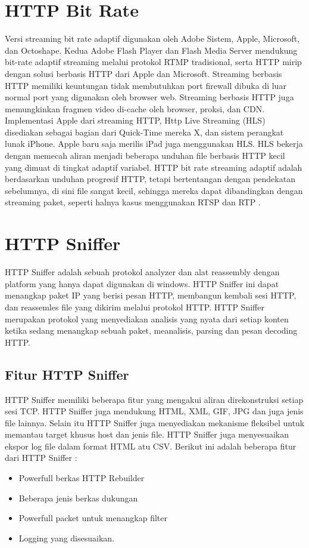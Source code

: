 \section{HTTP Bit Rate}
Versi streaming bit rate adaptif digunakan oleh Adobe Sistem, Apple, Microsoft, dan Octoshape. Kedua Adobe Flash Player dan Flash Media Server mendukung bit-rate adaptif streaming melalui protokol RTMP tradisional, serta HTTP mirip dengan solusi berbasis HTTP dari Apple dan Microsoft. Streaming berbasis HTTP memiliki keuntungan tidak membutuhkan port firewall dibuka di luar normal port yang digunakan oleh browser web. Streaming berbasis HTTP juga memungkinkan fragmen video di-cache oleh browser, proksi, dan CDN. Implementasi Apple dari streaming HTTP, Http Live Streaming (HLS) disediakan sebagai bagian dari Quick-Time mereka X, dan sistem perangkat lunak iPhone. Apple baru saja merilis iPad juga menggunakan HLS. HLS bekerja dengan memecah aliran menjadi beberapa unduhan file berbasis HTTP kecil yang dimuat di tingkat adaptif variabel. HTTP bit rate streaming adaptif adalah berdasarkan unduhan progresif HTTP, tetapi bertentangan dengan pendekatan sebelumnya, di sini file sangat kecil, sehingga mereka dapat dibandingkan dengan streaming paket, seperti halnya kasus menggunakan RTSP dan RTP
\cite{hsu2013startup}.

\section{HTTP Sniffer}
HTTP Sniffer adalah sebuah protokol analyzer dan alat reassembly dengan platform yang hanya dapat digunakan di windows. HTTP Sniffer ini dapat menangkap paket IP yang berisi pesan HTTP, membangun kembali sesi HTTP, dan reassemles file yang dikirim melalui protokol HTTP. HTTP Sniffer merupakan protokol yang menyediakan analisis yang nyata dari setiap konten ketika sedang menangkap sebuah paket, meanalisis, parsing dan pesan decoding HTTP\cite{sujana2015perangkat}.

\subsection{Fitur HTTP Sniffer}
HTTP Sniffer memiliki beberapa fitur yang mengakui aliran direkonstruksi setiap sesi TCP. HTTP Sniffer juga mendukung HTML, XML, GIF, JPG dan juga jenis file lainnya. Selain itu HTTP Sniffer juga menyediakan mekanisme fleksibel untuk memantau target khusus host dan jenis  file. HTTP Sniffer juga menyesuaikan ekspor log file dalam format HTML atu CSV.  Berikut ini adalah beberapa fitur dari HTTP Sniffer :
\begin{itemize}
\item Powerfull berkas HTTP Rebuilder
\item Beberapa jenis berkas dukungan
\item Powerfull packet untuk menangkap filter
\item Logging yang disesuaikan\cite{sujana2015perangkat}.
\end{itemize}
